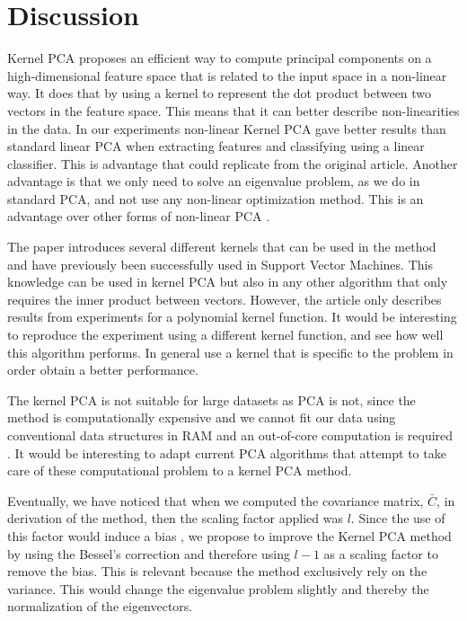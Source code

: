 \section{Discussion}
Kernel PCA proposes an efficient way to compute principal components on a high-dimensional feature space that is related to the input space in a non-linear way. It does that by using a kernel to represent the dot product between two vectors in the feature space. This means that it can better describe non-linearities in the data.
In our experiments non-linear Kernel PCA gave better results than standard linear PCA when extracting features and classifying using a linear classifier. This is advantage that could replicate from the original article. 
Another advantage is that we only need to solve an eigenvalue problem, as we do in standard PCA, and not use any non-linear optimization method. This is an advantage over other forms of non-linear PCA \cite{scholkopf1997kernel}.

The paper introduces several different kernels that can be used in the method and have previously been successfully used in Support Vector Machines. This knowledge can be used in kernel PCA but also in any other algorithm that only requires the inner product between vectors. However, the article only describes results from experiments for a polynomial kernel function. It would be interesting to reproduce the experiment using a different kernel function, and see how well this algorithm performs. In general use a kernel that is specific to the problem in order obtain a better performance.

The kernel PCA is not suitable for large datasets as PCA is not, since the method is computationally expensive and we cannot fit our data using conventional data structures in RAM and an out-of-core computation is required \cite{halko2011algorithm}. It would be interesting to adapt current PCA algorithms that attempt to take care of these computational problem to a kernel PCA method.

Eventually, we have noticed that when we computed the covariance matrix, $\bar{C}$, in derivation of the method, then the scaling factor applied was $l$. Since the use of this factor would induce a bias \cite{farebrother1999fitting}, we propose to improve the Kernel PCA method by using the Bessel's correction and therefore using $l - 1$ as a scaling factor to remove the bias. This is relevant because the method exclusively rely on the variance. This would change the eigenvalue problem slightly and thereby the normalization of the eigenvectors.
